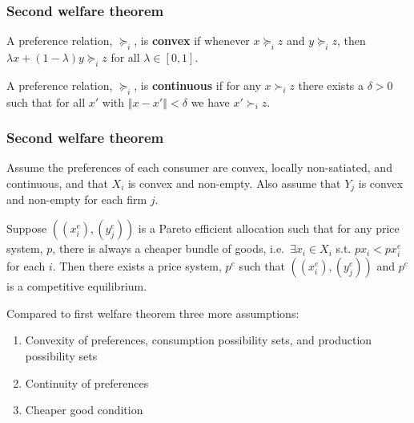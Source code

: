 \documentclass[compress]{beamer}
\newcommand{\norm}[1]{\left\Vert {#1} \right\Vert}
\newcommand{\prefeq}{\succeq}
\newcommand{\pref}{\succ}
\begin{document}
\begin{frame}
  \frametitle{Second welfare theorem}
  \begin{definition}
    A preference relation, $\prefeq_i$, is \textbf{convex} if whenever $x
    \prefeq_i z$ and $y \prefeq_i z$, then $\lambda x + (1-\lambda) y
    \prefeq_i z$ for all $\lambda \in [0,1]$. 
  \end{definition}
  
  \begin{definition}
    A preference relation, $\prefeq_i$, is \textbf{continuous} if
    for any  $x \pref_i z$ there exists a $\delta >
    0$ such that for all $x'$ with $\norm{x - x'}<\delta$ we have $x'
    \pref_i z$.
  \end{definition}
\end{frame}

\begin{frame}
  \frametitle{Second welfare theorem}
  \begin{theorem}
    Assume the preferences of each consumer are convex, locally
    non-satiated, and continuous, and that $X_i$ is convex and
    non-empty.  
    Also assume that $Y_j$ is convex and non-empty for each
    firm $j$. 
    
    Suppose $((x_i^e), (y_j^e))$ is a Pareto efficient allocation such
    that for any price system, $p$, there is always a cheaper bundle of
    goods, i.e.\ $\exists x_i \in X_i$ s.t. $p x_i < p x_i^e$ for each
    $i$. Then there exists a price system, $p^e$ such that $((x_i^e),
    (y_j^e))$ and $p^e$ is a competitive equilibrium.
  \end{theorem}  
\end{frame}

\begin{frame}
  Compared to first welfare theorem three more assumptions:
  \begin{enumerate}
  \item Convexity of preferences, consumption possibility sets, and
    production possibility sets
  \item Continuity of preferences
  \item Cheaper good condition
  \end{enumerate}
\end{frame}
\end{document}
